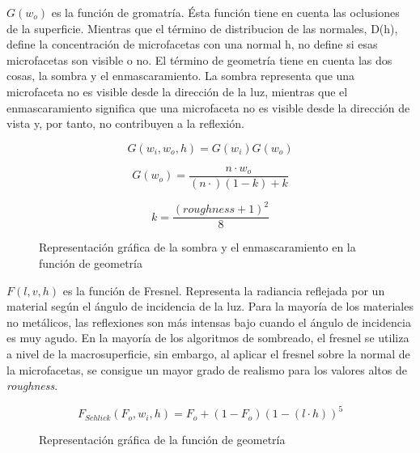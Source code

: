         $G(w_o)$ es la funci\'on de gromatr\'ia. \'Esta funci\'on tiene en cuenta las oclusiones de la superficie.
        Mientras que el t\'ermino de distribucion de las normales, D(h), define la concentraci\'on de microfacetas con una normal h,
        no define si esas microfacetas son visible o no. El t\'ermino de geometr\'ia tiene en cuenta las dos cosas, la sombra
        y el enmascaramiento. La sombra representa que una microfaceta no es visible desde la direcci\'on de la luz, mientras que el
        enmascaramiento significa que una microfaceta no es visible desde la direcci\'on de vista y, por tanto, no contribuyen
        a la reflexi\'on.

        $$
        G(w_i, w_o, h) = G(w_i)G(w_o)
        $$

        $$
        G(w_o) = \frac{n\cdot{w_o}}{(n\cdot) (1 - k) + k}
        $$

        $$
        k = \frac{(roughness + 1)^2}{8}
        $$

        \begin{figure}[H]
            \vspace{0.5cm}
            \centering
            \caption{Representaci\'on gr\'afica de la sombra y el enmascaramiento en la funci\'on de geometr\'ia}
        \end{figure}

        $F(l, v, h)$ es la funci\'on de Fresnel. Representa la radiancia reflejada por un material seg\'un el \'angulo de incidencia
        de la luz. Para la mayor\'ia de los materiales no met\'alicos, las reflexiones son m\'as intensas bajo cuando el \'angulo
        de incidencia es muy agudo. En la mayor\'ia de los algoritmos de sombreado, el fresnel se utiliza a nivel de la macrosuperficie,
        sin embargo, al aplicar el fresnel sobre la normal de la microfacetas, se consigue un mayor grado de realismo para los valores
        altos de \textit{roughness}.

        $$
        F_{Schlick}(F_o, w_i, h) = F_o + (1 - F_o) (1 - (l\cdot{h}))^5
        $$
    
        \begin{figure}[H]
            \vspace{0.5cm}
            \centering
            \caption{Representaci\'on gr\'afica de la funci\'on de geometr\'ia}
        \end{figure}

